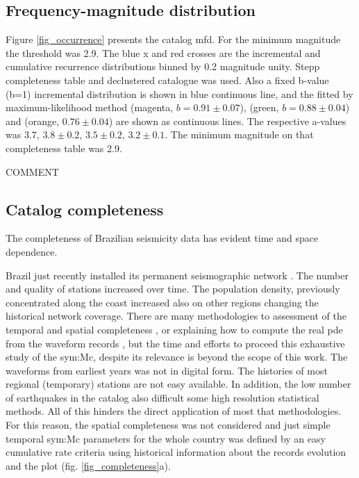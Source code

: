 \documentclass[draft, grl]{agutex}
\begin{document}
\begin{article}
\subsection{Frequency-magnitude distribution}

Figure \ref{fig_occurrence} presents the catalog \gls{mfd}. For the minimum magnitude the threshold was 2.9. The blue x and red crosses are the incremental and cumulative recurrence distributions binned by 0.2 magnitude unity. Stepp completeness table and \citet{bsb_2014} declustered catalogue was used. Also a fixed b-value (b=1) incremental distribution is shown in blue continuous line, and the fitted by maximum-likelihood method (magenta, $b=0.91\pm0.07$), \citet{weichert_1980} (green, $b=0.88\pm0.04$) and \citet{kijko_2012} (orange, $0.76\pm0.04$) are shown as continuous lines. The respective a-values was $3.7$, $3.8\pm0.2$, $3.5\pm0.2$, $3.2\pm0.1$. The minimum magnitude on that completeness table was 2.9.

COMMENT

\subsection{Catalog completeness}

The completeness of Brazilian seismicity data has evident time and space dependence.

Brazil just recently installed its permanent seismographic network \citep{pirchiner_2011}. The number and quality of stations increased over time. The population density, previously concentrated along the coast increased also on other regions changing the historical network coverage. %
There are many methodologies to assessment of the temporal and spatial completeness \citep{stepp_1972, mignan_woessner_2012, ogata_1993, wiemer_wyss_2000, cao_gao_2002, stucchi_2004, woessner_2005, mignan_2011, mignan_2012, vorobieva_2013, mignan_2013, nasir_2013, mignan_2014}, or explaining how to compute the real \gls{pde} from the waveform records \citep{schorlemmer_2008}, but the time and efforts to proceed this exhaustive study of the \glsdesc{sym:Mc}, despite its relevance is beyond the scope of this work. The waveforms from earliest years was not in digital form. The histories of most regional (temporary) stations are not easy available. In addition, the low number of earthquakes in the catalog also difficult some high resolution statistical methods. All of this hinders the direct application of most that methodologies. For this reason, the spatial completeness was not considered and just simple temporal \gls{sym:Mc} parameters for the whole country was defined by an easy cumulative rate criteria using historical information about the records evolution and the \citet{stepp_1972} plot (fig. \ref{fig_completeness}a). 


\end{article}
\end{document}
